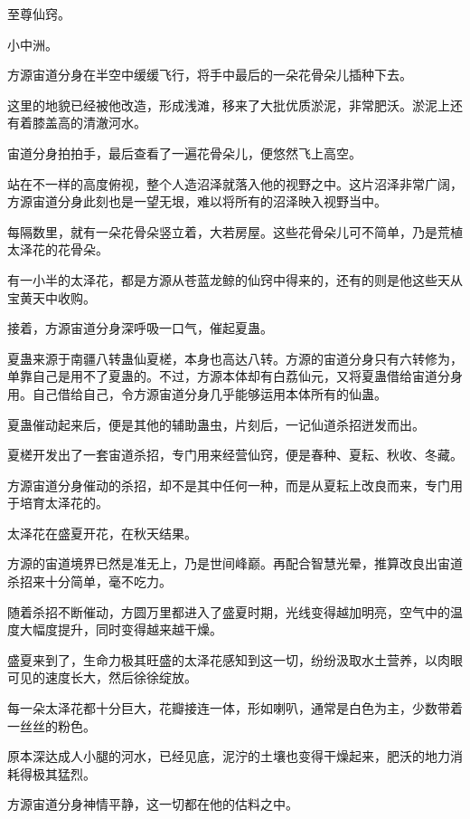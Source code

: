
\begin{this_body}

至尊仙窍。

小中洲。

方源宙道分身在半空中缓缓飞行，将手中最后的一朵花骨朵儿插种下去。

这里的地貌已经被他改造，形成浅滩，移来了大批优质淤泥，非常肥沃。淤泥上还有着膝盖高的清澈河水。

宙道分身拍拍手，最后查看了一遍花骨朵儿，便悠然飞上高空。

站在不一样的高度俯视，整个人造沼泽就落入他的视野之中。这片沼泽非常广阔，方源宙道分身此刻也是一望无垠，难以将所有的沼泽映入视野当中。

每隔数里，就有一朵花骨朵竖立着，大若房屋。这些花骨朵儿可不简单，乃是荒植太泽花的花骨朵。

有一小半的太泽花，都是方源从苍蓝龙鲸的仙窍中得来的，还有的则是他这些天从宝黄天中收购。

接着，方源宙道分身深呼吸一口气，催起夏蛊。

夏蛊来源于南疆八转蛊仙夏槎，本身也高达八转。方源的宙道分身只有六转修为，单靠自己是用不了夏蛊的。不过，方源本体却有白荔仙元，又将夏蛊借给宙道分身用。自己借给自己，令方源宙道分身几乎能够运用本体所有的仙蛊。

夏蛊催动起来后，便是其他的辅助蛊虫，片刻后，一记仙道杀招迸发而出。

夏槎开发出了一套宙道杀招，专门用来经营仙窍，便是春种、夏耘、秋收、冬藏。

方源宙道分身催动的杀招，却不是其中任何一种，而是从夏耘上改良而来，专门用于培育太泽花的。

太泽花在盛夏开花，在秋天结果。

方源的宙道境界已然是准无上，乃是世间峰巅。再配合智慧光晕，推算改良出宙道杀招来十分简单，毫不吃力。

随着杀招不断催动，方圆万里都进入了盛夏时期，光线变得越加明亮，空气中的温度大幅度提升，同时变得越来越干燥。

盛夏来到了，生命力极其旺盛的太泽花感知到这一切，纷纷汲取水土营养，以肉眼可见的速度长大，然后徐徐绽放。

每一朵太泽花都十分巨大，花瓣接连一体，形如喇叭，通常是白色为主，少数带着一丝丝的粉色。

原本深达成人小腿的河水，已经见底，泥泞的土壤也变得干燥起来，肥沃的地力消耗得极其猛烈。

方源宙道分身神情平静，这一切都在他的估料之中。


\end{this_body}
